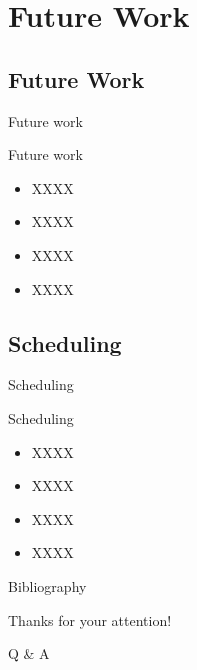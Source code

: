 \documentclass{beamer}
\begin{document}
\section{Future Work}

\subsection{Future Work}

\begin{frame}{Future work}
  \begin{block}{Future work}
    \begin{itemize}
      \setlength{\itemsep}{6pt}
      \item XXXX
      \item XXXX
      \item XXXX
      \item XXXX
    \end{itemize}
  \end{block}
\end{frame}

\subsection{Scheduling}

\begin{frame}{Scheduling}
  \begin{block}{Scheduling}
    \begin{itemize}
      \setlength{\itemsep}{6pt}
      \item XXXX\cite{webster2010}
      \item XXXX\cite{jones2006}
      \item XXXX\cite{mcmahan2005}
      \item XXXX\cite{Gravagne2003}
    \end{itemize}
  \end{block}
\end{frame}

\begin{frame}[allowframebreaks]{Bibliography}
  
  
\end{frame}

\begin{frame}
	\begin{center}
    {\Huge\calligra Thanks for your attention!}
    \vspace{1cm}

    {\Huge Q \& A}
  \end{center}
\end{frame}
\end{document}
